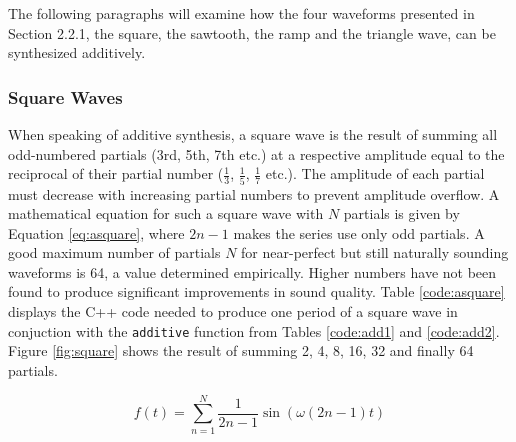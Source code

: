 \documentclass[12pt,twoside]{report}
\begin{document}
\begin{table}
   {}
\end{table}

\noindent The following paragraphs will examine how the four waveforms presented in Section 2.2.1, the square, the sawtooth, the ramp and the triangle wave, can be synthesized additively.

\subsubsection{Square Waves}

When speaking of additive synthesis, a square wave is the result of summing all odd-numbered partials (3rd, 5th, 7th etc.) at a respective amplitude equal to the reciprocal of their partial number ($\frac{1}{3}$, $\frac{1}{5}$, $\frac{1}{7}$ etc.). The amplitude of each partial must decrease with increasing partial numbers to prevent amplitude overflow. A mathematical equation for such a square wave with $N$ partials is given by Equation \ref{eq:asquare}, where $2n - 1$ makes the series use only odd partials. A good maximum number of partials $N$ for near-perfect but still naturally sounding waveforms is 64, a value determined empirically. Higher numbers have not been found to produce significant improvements in sound quality. Table \ref{code:asquare} displays the C++ code needed to produce one period of a square wave in conjuction with the \texttt{additive} function from Tables \ref{code:add1} and \ref{code:add2}. Figure \ref{fig:square} shows the result of summing 2, 4, 8, 16, 32 and finally 64 partials.

\begin{equation}
  f(t) = \sum\limits_{n=1}^N \frac{1}{2n -1} \sin(\omega (2n - 1) t)
  \label{eq:asquare}
\end{equation}
\end{document}
